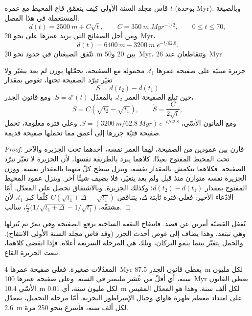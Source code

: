 قاس مجلد السنة الأولى كيف يتعمّق قاع المحيط مع عمره $t$ (بوحدة \unit{Myr}). وبالصيغة
المستعملة في هذا الفصل:
\[
d(t) = \qty{2500}{m} + C\sqrt{t}, \qquad C = \qty{350}{m.Myr^{-1/2}}, \qquad 0 \le t \le 70,
\]
ومن أجل الصفائح التي يزيد عمرها على نحو \qty{20}{Myr}،
\[
d(t) = \qty{6400}{m} - \qty{3200}{m}\; e^{-t/62.8}.
\]
تتّفق الصيغتان في حدود نحو \qty{20}{m} بين 20 و\qty{50}{Myr}، وتتقاطعان عند
\qty{26}{Myr}.

\begin{proposition}\label{prop:b2:oceanic-islands:sinking}
جزيرة مبنيّة على صفيحة عمرها $t_1$، محمولة مع الصفيحة، تحمّلها بوزن
لم يعد يتغيّر ولا تغيّر تبرّد الصفيحة تحتها، تغوص بمقدار
\[
S = d(t_2) - d(t_1)
\]
حين تبلغ الصفيحة العمر $t_2$، بالمعدّل $\dot S = d'(t)$. ومع قانون الجذر،
\[
S = C\left(\sqrt{t_2} - \sqrt{t_1}\right), \qquad \dot S = \frac{C}{2\sqrt t},
\]
ومع القانون الأسّي، $\dot S = (\qty{3200}{m}/\qty{62.8}{Myr})\,e^{-t/62.8}$. وعلى فترة
معلومة، تحمل صفيحة فتيّة جزرها إلى أعمق مما تحملها صفيحة قديمة.
\end{proposition}

\begin{proof}
قارن بين عمودين من الصفيحة، لهما العمر نفسه، أحدهما تحت الجزيرة والآخر تحت المحيط
المفتوح بعيدًا. كلاهما يبرد بالطريقة نفسها، لأن الجزيرة لا تغيّر تبرّد الصفيحة. فكلاهما ينكمش بالمقدار نفسه، وينزل سطح كلّ منهما بالمقدار
نفسه. ووزن الجزيرة نفسه متوازن منذ قبل ولم يعد يتغيّر، فلا يضيف شيئًا
آخر. وينزل عمود المحيط المفتوح بمقدار $d(t_2) - d(t_1)$؛ وكذلك الجزيرة. وبالاشتقاق
نحصل على المعدّل. أمّا الادّعاء الأخير: فعلى فترة ثابتة $\Delta$، يتناقص $C(\sqrt{t_1 + \Delta} -
\sqrt{t_1})$ كلّما كبر $t_1$، لأن مشتقّه، $\frac C2\bigl(1/\sqrt{t_1 + \Delta}
- 1/\sqrt{t_1}\bigr)$، سالب.
\end{proof}

تُغفل القضيّة أمرين عن قصد. فانتفاخ البقعة الساخنة يرفع الصفيحة وهي تمرّ
ثم يُنزلها وهي تبتعد، وهذا يضاف إلى غوص أحدث الجزر
(وقد قاس مجلد السنة الأولى الانتفاخ). والحمل يتغيّر بينما ينمو البركان، وتلك هي
المرحلة السريعة أعلاه. فإذا انقضى كلاهما، تبعت الجزيرة القاع.

المعدّلات صغيرة. فعلى صفيحة عمرها \qty{4}{Myr} يعطي قانون الجذر \qty{87.5}{m} لكل مليون
سنة، أي أقلّ من عُشر مليمتر في السنة. وعلى صفيحة عمرها \qty{100}{Myr} يعطي القانون الأسّي
\qty{10.4}{m} لكل مليون سنة، أي \qty{0.01}{m} لكل ألف سنة. وهذا هو المعدّل
المقيس على امتداد معظم ظهرة هاواي وجبال الإمبراطور البحرية. أمّا مرحلة التحميل، بمعدّل
\qty{2.6}{m} لكل ألف سنة، فأسرع بنحو 250 مرة.


